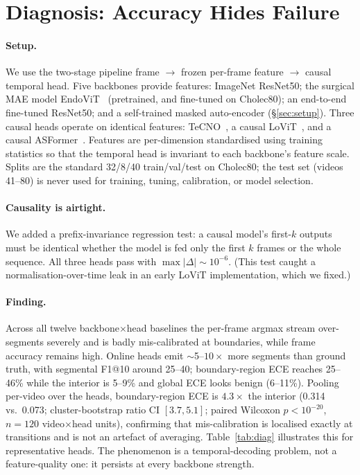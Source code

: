 \documentclass[11pt]{article}
\begin{document}
\section{Diagnosis: Accuracy Hides Failure}
\label{sec:diagnosis}
\paragraph{Setup.} We use the two-stage pipeline frame $\to$ frozen per-frame
feature $\to$ causal temporal head. Five backbones provide features: ImageNet
ResNet50; the surgical MAE model EndoViT~\cite{endovit} (pretrained, and fine-tuned
on Cholec80); an end-to-end fine-tuned ResNet50; and a self-trained masked
auto-encoder (\S\ref{sec:setup}). Three causal heads operate on identical features:
TeCNO~\cite{czempiel2020}, a causal LoViT~\cite{liu2023}, and a causal
ASFormer~\cite{yi2021}. Features are per-dimension standardised using training
statistics so that the temporal head is invariant to each backbone's feature scale.
Splits are the standard 32/8/40 train/val/test on Cholec80; the test set
(videos 41--80) is never used for training, tuning, calibration, or model selection.

\paragraph{Causality is airtight.} We added a prefix-invariance regression test: a
causal model's first-$k$ outputs must be identical whether the model is fed only the
first $k$ frames or the whole sequence. All three heads pass with
$\max|\Delta|\!\sim\!10^{-6}$. (This test caught a normalisation-over-time leak in an
early LoViT implementation, which we fixed.)

\paragraph{Finding.} Across all twelve backbone$\times$head baselines the
per-frame argmax stream over-segments severely and is badly mis-calibrated at
boundaries, while frame accuracy remains high. Online heads emit $\sim$5--$10\times$
more segments than ground truth, with segmental F1@10 around 25--40; boundary-region
ECE reaches 25--46\% while the interior is 5--9\% and global ECE looks benign
(6--11\%). Pooling per-video over the heads, boundary-region ECE is
$\mathbf{4.3\times}$ the interior (0.314 vs.\ 0.073; cluster-bootstrap ratio CI
$[3.7,5.1]$; paired Wilcoxon $p<10^{-20}$, $n{=}120$ video$\times$head units),
confirming that mis-calibration is localised exactly at transitions and is not an
artefact of averaging. Table~\ref{tab:diag} illustrates this for representative heads.
The phenomenon is a temporal-decoding problem, not a feature-quality one: it persists
at every backbone strength.
\end{document}
